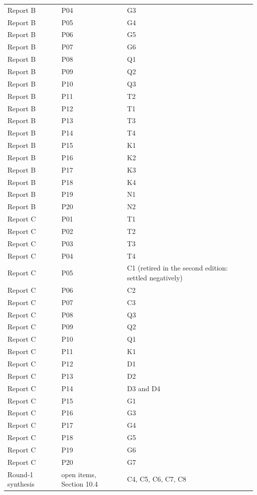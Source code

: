 \documentclass[11pt,a4paper]{article}
\theoremstyle{definition}\newtheorem{definition}[theorem]{Definition}
\theoremstyle{remark}\newtheorem{remark}[theorem]{Remark}
\begin{document}
\begin{longtable}{@{}p{}p{}p{}@{}}
Report B & P04 & G3 \\
Report B & P05 & G4 \\
Report B & P06 & G5 \\
Report B & P07 & G6 \\
Report B & P08 & Q1 \\
Report B & P09 & Q2 \\
Report B & P10 & Q3 \\
Report B & P11 & T2 \\
Report B & P12 & T1 \\
Report B & P13 & T3 \\
Report B & P14 & T4 \\
Report B & P15 & K1 \\
Report B & P16 & K2 \\
Report B & P17 & K3 \\
Report B & P18 & K4 \\
Report B & P19 & N1 \\
Report B & P20 & N2 \\
Report C & P01 & T1 \\
Report C & P02 & T2 \\
Report C & P03 & T3 \\
Report C & P04 & T4 \\
Report C & P05 & C1 (retired in the second edition: settled negatively) \\
Report C & P06 & C2 \\
Report C & P07 & C3 \\
Report C & P08 & Q3 \\
Report C & P09 & Q2 \\
Report C & P10 & Q1 \\
Report C & P11 & K1 \\
Report C & P12 & D1 \\
Report C & P13 & D2 \\
Report C & P14 & D3 and D4 \\
Report C & P15 & G1 \\
Report C & P16 & G3 \\
Report C & P17 & G4 \\
Report C & P18 & G5 \\
Report C & P19 & G6 \\
Report C & P20 & G7 \\
Round-1 synthesis & open items, Section 10.4 & C4, C5, C6, C7, C8 \\
\end{longtable}
\normalsize
\end{document}
